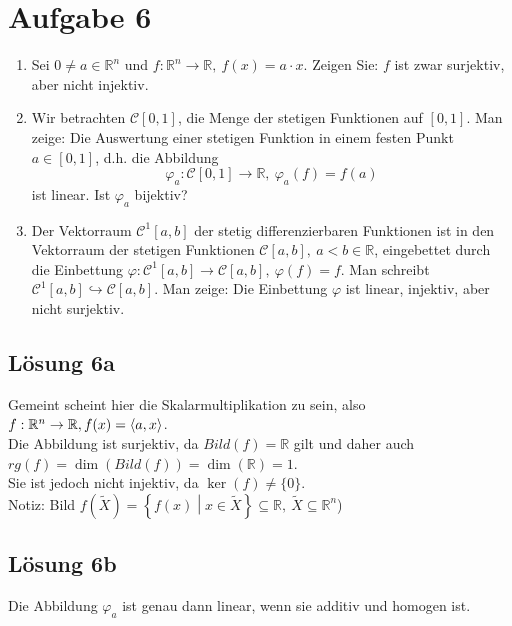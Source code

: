 \documentclass[main.tex]{subfiles}
\begin{document}
\section{Aufgabe 6}

\begin{enumerate}
    \item Sei $0\neq a\in \mathbb{R}^{n}$ und $f:\mathbb{R}^{n}\rightarrow \mathbb{R} ,\ f( x) =a\cdotp x$. Zeigen Sie: $f$ ist zwar surjektiv, aber nicht injektiv.
    \item Wir betrachten $\mathcal{C}[ 0,1]$, die Menge der stetigen Funktionen auf $[ 0,1]$. Man zeige: Die Auswertung einer stetigen Funktion in einem festen Punkt $a\in [ 0,1]$, d.h. die Abbildung
        \begin{equation*}
            \varphi _{a} :\mathcal{C}[ 0,1]\rightarrow \mathbb{R} ,\ \varphi _{a}( f) =f( a)
        \end{equation*}
        ist linear. Ist $\varphi _{a}$ bijektiv?
    \item Der Vektorraum $\mathcal{C}^{1}[ a,b]$ der stetig differenzierbaren Funktionen ist in den Vektorraum der stetigen Funktionen $\mathcal{C}[ a,b] ,\ a< b\in \mathbb{R}$, eingebettet durch die Einbettung $\varphi :\mathcal{C}^{1}[ a,b]\rightarrow \mathcal{C}[ a,b] ,\ \varphi ( f) =f.$ Man schreibt $\mathcal{C}^{1}[ a,b] \hookrightarrow \mathcal{C}[ a,b] .$ Man zeige: Die Einbettung $\varphi $ ist linear, injektiv, aber nicht surjektiv.
\end{enumerate}

\subsection{Lösung 6a}
Gemeint scheint hier die Skalarmultiplikation zu sein, also $f:\mathbb{R}^{n}\rightarrow \mathbb{R} ,f(x) = \langle a,x\rangle $.\\

Die Abbildung ist surjektiv, da $Bild( f) =\mathbb{R}$ gilt und daher auch $rg( f) =\dim( Bild( f)) =\dim(\mathbb{R}) =1$.\\

Sie ist jedoch nicht injektiv, da $\ker( f) \neq \{0\}$.\\

Notiz: Bild $f\left(\tilde{X}\right) =\left\{f( x)\middle| x\in \tilde{X}\right\} \subseteq \mathbb{R} ,\ \tilde{X} \subseteq \mathbb{R}^{n}$)


\subsection{Lösung 6b}
Die Abbildung $\varphi _{a}$ ist genau dann linear, wenn sie additiv und homogen ist.
\end{document}
